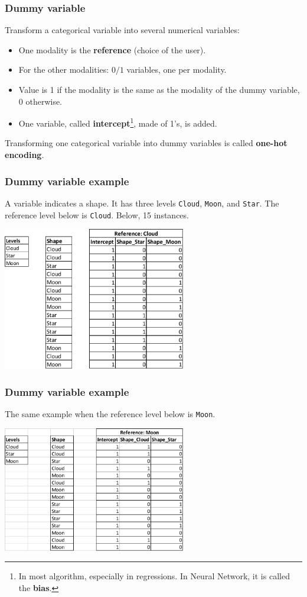 \begin{frame}
\frametitle{Dummy variable}
Transform a categorical variable into several numerical variables:
\begin{itemize}
\item One modality is the {\bf reference} (choice of the user).
\item For the other modalities: $0/1$ variables, one per modality. 
\item Value is 1 if the modality is the same as the modality of the dummy variable, 0 otherwise.
\item One variable, called {\bf intercept}\footnote{In most algorithm, especially in regressions. In Neural Network, it is called the {\bf bias}.}, made of 1's, is added.
\end{itemize}
Transforming one categorical variable into dummy variables is called {\bf one-hot encoding}.
\end{frame}
\begin{frame}
\frametitle{Dummy variable example}
A variable indicates a shape. It has three levels {\tt Cloud}, {\tt Moon}, and {\tt Star}. The reference level below is {\tt Cloud}. Below, 15 instances. 
\begin{center}
\includegraphics[width=8cm]{../Graphs/Dummy_1.png}  
\end{center}
\end{frame}
\begin{frame}
\frametitle{Dummy variable example}
The same example when the reference level below is {\tt Moon}. 
\begin{center}
\includegraphics[width=8cm]{../Graphs/Dummy_2.png}  
\end{center}
\end{frame}
